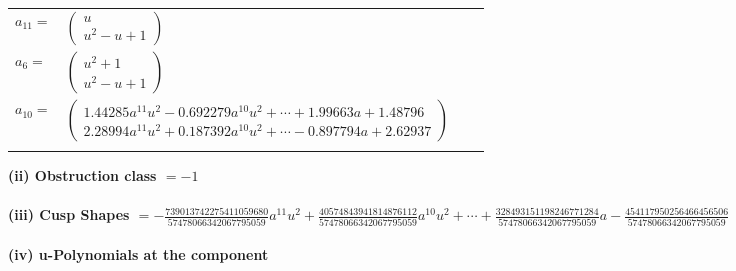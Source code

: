 \documentclass[1p]{elsarticle_modified}
\theoremstyle{definition}
\begin{document}
\begin{tabular}{m{7pt} m{180pt} m{7pt} m{180pt} }
\flushright $a_{11}=$&$\begin{pmatrix}u\\u^2- u+1\end{pmatrix}$ \\
\flushright $a_{6}=$&$\begin{pmatrix}u^2+1\\u^2- u+1\end{pmatrix}$ \\
\flushright $a_{10}=$&$\begin{pmatrix}1.44285 a^{11} u^{2}-0.692279 a^{10} u^{2}+\cdots+1.99663 a+1.48796\\2.28994 a^{11} u^{2}+0.187392 a^{10} u^{2}+\cdots-0.897794 a+2.62937\end{pmatrix}$\\&\end{tabular}
\flushleft \textbf{(ii) Obstruction class $= -1$}\\~\\
\flushleft \textbf{(iii) Cusp Shapes $= -\frac{739013742275411059680}{57478066342067795059} a^{11} u^2+\frac{40574843941814876112}{57478066342067795059} a^{10} u^2+\cdots+\frac{328493151198246771284}{57478066342067795059} a-\frac{454117950256466456506}{57478066342067795059}$}\\~\\
\newpage\renewcommand{\arraystretch}{1}
\flushleft \textbf{(iv) u-Polynomials at the component}\newline \\
\end{document}

